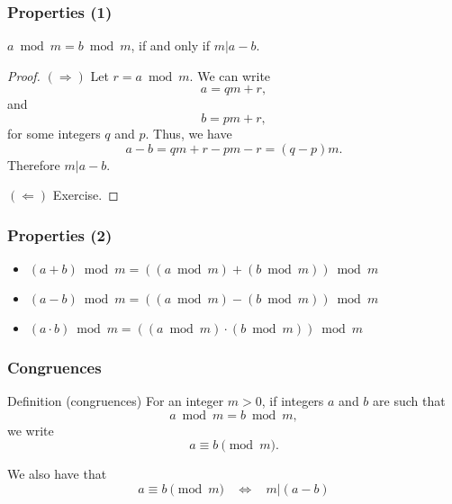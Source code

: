 \begin{frame}
  \frametitle{Properties (1)}

  $a \bmod m = b \bmod m$, if and only if $m|a - b$.

  \pause

  \begin{proof}
    {\small
      $(\Rightarrow)$
      Let $r=a \bmod m$.  We can write
      \[
      a = qm + r,
      \]
      and
      \[
      b = pm + r,
      \]
      for some integers $q$ and $p$.  Thus, we have
      \[
      a - b = qm + r - pm - r = (q-p)m.
      \]
      Therefore $m|a-b$.

      $(\Leftarrow)$ Exercise.
    }
  \end{proof}
  
\end{frame}

\begin{frame}
  \frametitle{Properties (2)}

  \begin{itemize}
  \item $(a + b) \bmod m = ((a \bmod m) + (b \bmod m)) \bmod m$
  \item $(a - b) \bmod m = ((a \bmod m) - (b \bmod m)) \bmod m$
  \item $(a \cdot b) \bmod m = ((a \bmod m) \cdot (b \bmod m)) \bmod m$
  \end{itemize}
  
\end{frame}

\begin{frame}
  \frametitle{Congruences}

  \begin{block}{Definition (congruences)}
    For an integer $m>0$,
    if integers $a$ and $b$ are such that
    \[
    a \bmod m = b \bmod m,
    \]
    we write
    \[
    a \equiv b \pmod m.
    \]
  \end{block}

  \pause

  We also have that
  \[
  a \equiv b \pmod m \ \ \ \ \Leftrightarrow \ \ \ \
  m|(a-b)
  \]
\end{frame}

